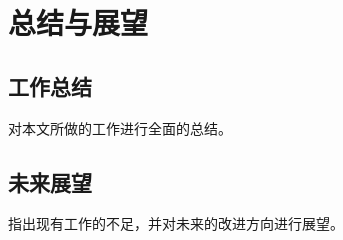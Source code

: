 \chapter{总结与展望}
\label{chap:summary}

\section{工作总结}
对本文所做的工作进行全面的总结。

\section{未来展望}
指出现有工作的不足，并对未来的改进方向进行展望。
